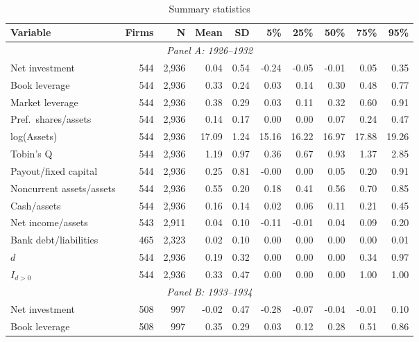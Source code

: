 \begin{table}[p]\centering
\caption{\\ Summary statistics}\scriptsize
\label{tab:sum_main}
\begin{tabular}{lrrrrrrrrr}
\toprule
Variable & Firms & N & Mean & SD & 5\% & 25\% & 50\% & 75\% & 95\%\\
\midrule
\multicolumn{10}{c}{\textit{Panel A: 1926--1932}}\\
\midrule
Net investment              & 544 & 2,936 & 0.04 & 0.54 & -0.24 & -0.05 & -0.01 &  0.05 & 0.35 \\
Book leverage               & 544 & 2,936 & 0.33 & 0.24 &  0.03 &  0.14 &  0.30 &  0.48 & 0.77 \\
Market leverage             & 544 & 2,936 & 0.38 & 0.29 &  0.03 &  0.11 &  0.32 &  0.60 & 0.91 \\
Pref.\ shares/assets        & 544 & 2,936 & 0.14 & 0.17 &  0.00 &  0.00 &  0.07 &  0.24 & 0.47 \\
log(Assets)                 & 544 & 2,936 & 17.09& 1.24 & 15.16 & 16.22 & 16.97 & 17.88 & 19.26 \\
Tobin's Q                   & 544 & 2,936 & 1.19 & 0.97 &  0.36 &  0.67 &  0.93 &  1.37 & 2.85 \\
Payout/fixed capital        & 544 & 2,936 & 0.25 & 0.81 & -0.00 &  0.00 &  0.05 &  0.20 & 0.91 \\
Noncurrent assets/assets    & 544 & 2,936 & 0.55 & 0.20 &  0.18 &  0.41 &  0.56 &  0.70 & 0.85 \\
Cash/assets                 & 544 & 2,936 & 0.16 & 0.14 &  0.02 &  0.06 &  0.11 &  0.21 & 0.45 \\
Net income/assets           & 543 & 2,911 & 0.04 & 0.10 & -0.11 & -0.01 &  0.04 &  0.09 & 0.20 \\
Bank debt/liabilities       & 465 & 2,323 & 0.02 & 0.10 &  0.00 &  0.00 &  0.00 &  0.00 & 0.01 \\
$d$                         & 544 & 2,936 & 0.19 & 0.32 &  0.00 &  0.00 &  0.00 &  0.34 & 0.97 \\
$I_{d>0}$                   & 544 & 2,936 & 0.33 & 0.47 &  0.00 &  0.00 &  0.00 &  1.00 & 1.00 \\
\midrule
\multicolumn{10}{c}{\textit{Panel B: 1933--1934}}\\
\midrule
Net investment              & 508 &   997 & -0.02& 0.47 & -0.28 & -0.07 & -0.04 & -0.01 & 0.10 \\
Book leverage               & 508 &   997 & 0.35 & 0.29 &  0.03 &  0.12 &  0.28 &  0.51 & 0.86 \\

\end{tabular}
\end{table}
